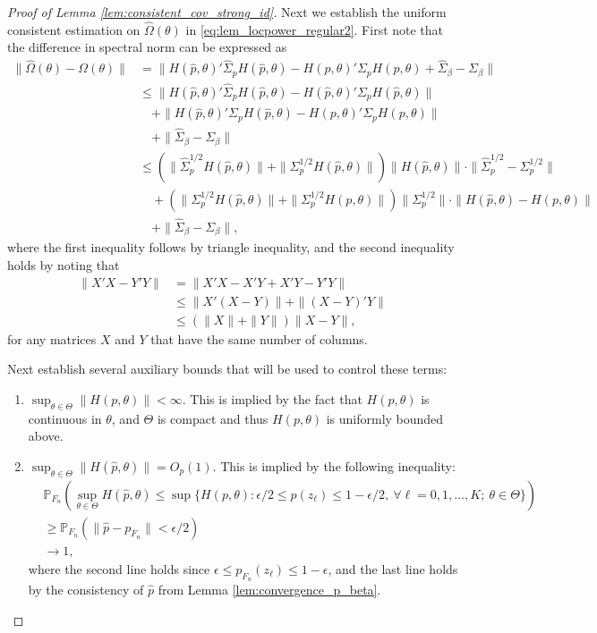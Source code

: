 \documentclass[11pt]{article}
\theoremstyle{definition}
\newcommand{\Prob}{\ensuremath{\mathbb{P}}} %
\newcommand{\0}{\ensuremath{\mathbf{0}}}
\begin{document}
\begin{bibunit}
\begin{proof}[Proof of Lemma \ref{lem:consistent_cov_strong_id}]
Next we establish the uniform consistent estimation on $\hat{\Omega}(\theta)$ in \eqref{eq:lem_locpower_regular2}. First note that the difference in spectral norm can be expressed as
\begin{align*}
    \|\hat{\Omega}(\theta) - \Omega(\theta)\|
    &= \|H(\hat{p},\theta)' \hat{\Sigma}_p H(\hat{p},\theta) - H(p,\theta)' \Sigma_{p} H(p, \theta) + \hat{\Sigma}_\beta - \Sigma_{\beta}\| \\
    &\leq \|H(\hat{p},\theta)' \hat{\Sigma}_p H(\hat{p},\theta) - H(\hat{p},\theta)' \Sigma_{p} H(\hat{p}, \theta)\| \\
    &\quad + \|H(\hat{p},\theta)' \Sigma_{p} H(\hat{p}, \theta) - H(p,\theta)' \Sigma_{p} H(p, \theta)\| \\
    &\quad + \|\hat{\Sigma}_\beta - \Sigma_{\beta}\|  \\
    &\leq \left(\|\hat{\Sigma}_p^{1/2}H(\hat{p},\theta)\| + \|\Sigma_{p}^{1/2}H(\hat{p},\theta)\|\right)\|H(\hat{p},\theta)\|\cdot \|\hat{\Sigma}_p^{1/2} - {\Sigma}_{p}^{1/2}\| \\
    &\quad + \left(\|\Sigma_{p}^{1/2} H(\hat{p},\theta)\| + \|\Sigma_{p}^{1/2} H(p,\theta)\|\right)\|\Sigma_{p}^{1/2}\| \cdot \|H(\hat{p},\theta) - H(p,\theta)\| \\
    &\quad + \|\hat{\Sigma}_\beta - \Sigma_{\beta}\|,
\end{align*}
where the first inequality follows by triangle inequality, and the second inequality holds by noting that 
\begin{align*}
    \|X'X - Y'Y\| 
    &= \|X'X - X'Y + X'Y - Y'Y\| \\
    &\leq \|X'(X-Y)\| + \|(X-Y)'Y\| \\
    &\leq (\|X\| + \|Y\|)\|X-Y\|,
\end{align*}
for any matrices $X$ and $Y$ that have the same number of columns. 

Next establish several auxiliary bounds that will be used to control these terms:
\begin{enumerate}
    \item $\sup_{\theta \in \Theta} \|H(p,\theta)\| < \infty$. This is implied by the fact that $H(p,\theta)$ is continuous in $\theta$, and $\Theta$ is compact and thus $H(p,\theta)$ is uniformly bounded above. 
    
    \item $\sup_{\theta \in \Theta}\|H(\hat{p},\theta)\| = O_p(1)$. This is implied by the following inequality:
    \begin{align*}
    &\Prob_{F_n}\left(\sup_{\theta\in\Theta}H(\hat{p},\theta) \leq \sup\{H(p,\theta): \epsilon/2 \leq p(z_\ell) \leq 1-\epsilon/2, ~ \forall \ell = 0,1,\ldots,K; ~ \theta\in\Theta\}\right) \\
    &\geq \Prob_{F_n}\left(\|\hat{p} - p_{F_n}\| < \epsilon/2\right) \\
    &\to 1,
    \end{align*}
    where the second line holds since $\epsilon\leq p_{F_n}(z_\ell) \leq 1-\epsilon$, and the last line holds by the consistency of $\hat{p}$ from Lemma \ref{lem:convergence_p_beta}. 
    

\end{enumerate}
\end{proof}
\end{bibunit}
\end{document}
